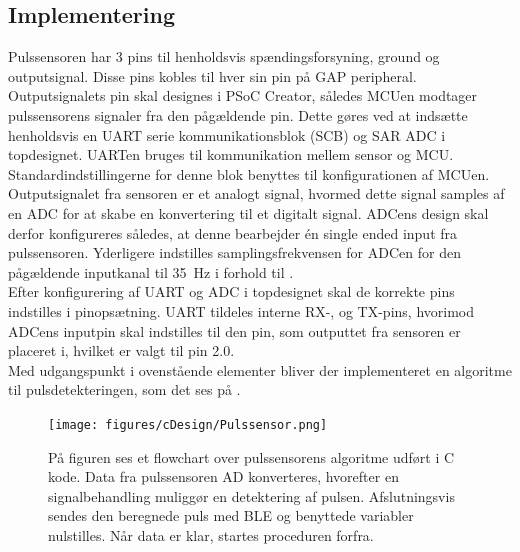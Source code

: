 \subsection{Implementering} \label{puls_impl}
Pulssensoren har 3 pins til henholdsvis spændingsforsyning, ground og outputsignal. Disse pins kobles til hver sin pin på GAP peripheral. Outputsignalets pin skal designes i PSoC Creator, således MCUen modtager pulssensorens signaler fra den pågældende pin. Dette gøres ved at indsætte henholdsvis en UART serie kommunikationsblok (SCB) og SAR ADC i topdesignet. UARTen bruges til kommunikation mellem sensor og MCU. Standardindstillingerne for denne blok benyttes til konfigurationen af MCUen. \newline
Outputsignalet fra sensoren er et analogt signal, hvormed dette signal samples af en ADC for at skabe en konvertering til et digitalt signal. ADCens design skal derfor konfigureres således, at denne bearbejder én single ended input fra pulssensoren. Yderligere indstilles samplingsfrekvensen for ADCen for den pågældende inputkanal til 35~Hz i forhold til . \\
Efter konfigurering af UART og ADC i topdesignet skal de korrekte pins indstilles i pinopsætning. UART tildeles interne RX-, og TX-pins, hvorimod ADCens inputpin skal indstilles til den pin, som outputtet fra sensoren er placeret i, hvilket er valgt til pin 2.0. \\
Med udgangspunkt i ovenstående elementer bliver der implementeret en algoritme til pulsdetekteringen, som det ses på .
\begin{figure}[H]
	\centering
	\texttt{[image: figures/cDesign/Pulssensor.png]}
	\caption{På figuren ses et flowchart over pulssensorens algoritme udført i C kode. Data fra pulssensoren AD konverteres, hvorefter en signalbehandling muliggør en detektering af pulsen. Afslutningsvis sendes den beregnede puls med BLE og benyttede variabler nulstilles. Når data er klar, startes proceduren forfra.}
	\label{fig:puls_pseudo_c}
\end{figure} \vspace{-.25cm}
